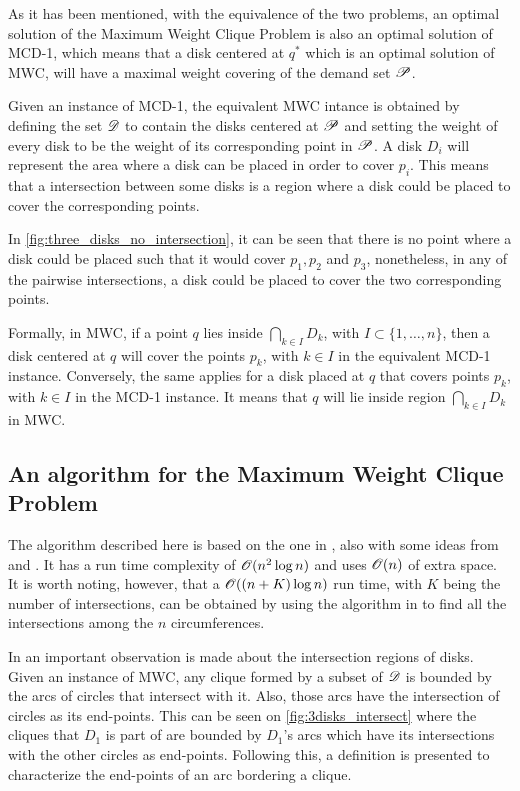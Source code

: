 As it has been mentioned, with the equivalence of the two problems, an optimal solution of the Maximum Weight Clique Problem is also an optimal solution of MCD-1, which means that a disk centered at $q^*$ which is an optimal solution of MWC, will have a maximal weight covering of the demand set $\mathscr{P}$.

Given an instance of MCD-1, the equivalent MWC intance is obtained by defining the set $\mathscr{D}$ to contain the disks centered at $\mathscr{P}$ and setting the weight of every disk to be the weight of its corresponding point in $\mathscr{P}$. A disk $D_i$ will represent the area where a disk can be placed in order to cover $p_i$. This means that a intersection between some disks is a region where a disk could be placed to cover the corresponding points.

In \autoref{fig:three_disks_no_intersection}, it can be seen that there is no point where a disk could be placed such that it would cover $p_1, p_2$ and $p_3$, nonetheless, in any of the pairwise intersections, a disk could be placed to cover the two corresponding points.

Formally, in MWC, if a point $q$ lies inside $\bigcap_{k \in I} D_k$, with $I \subset \{1,\dots,n\}$, then a disk centered at $q$ will cover the points $p_k$, with $k\in I$ in the equivalent MCD-1 instance. Conversely, the same applies for a disk placed at $q$ that covers points $p_k$, with $k \in I$ in the MCD-1 instance. It means that $q$ will lie inside region $\bigcap_{k \in I} D_k$ in MWC.

\subsection{An algorithm for the Maximum Weight Clique Problem}

The algorithm described here is based on the one in , also with some ideas from  and . It has a run time complexity of $\mathscr{O}(n^2\log{n})$ and uses $\mathscr{O}(n)$ of extra space. It is worth noting, however, that a $\mathscr{O}((n+K)\log{n})$ run time, with $K$ being the number of intersections, can be obtained by using the algorithm in  to find all the intersections among the $n$ circumferences.

In  an important observation is made about the intersection regions of disks. Given an instance of MWC, any clique formed by a subset of $\mathscr{D}$ is bounded by the arcs of circles that intersect with it. Also, those arcs have the intersection of circles as its end-points. This can be seen on \autoref{fig:3disks_intersect} where the cliques that $D_1$ is part of are bounded by $D_1$'s arcs which have its intersections with the other circles as end-points. Following this, a definition is presented to characterize the end-points of an arc bordering a clique.

